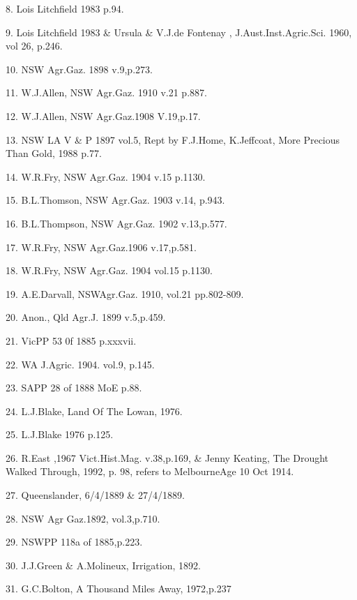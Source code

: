 8.  Lois Litchfield 1983 p.94.

9.  Lois Litchfield 1983 \& Ursula \& V.J.de Fontenay , J.Aust.Inst.Agric.Sci.
     1960, vol 26, p.246. 

10.  NSW Agr.Gaz. 1898 v.9,p.273. 

11. W.J.Allen, NSW Agr.Gaz. 1910 v.21 p.887.

12. W.J.Allen, NSW Agr.Gaz.1908 V.19,p.17.

13. NSW LA V \& P 1897 vol.5, Rept by F.J.Home,  K.Jeffcoat, More 
      Precious Than Gold, 1988 p.77.

14. W.R.Fry, NSW Agr.Gaz. 1904 v.15 p.1130.

15.  B.L.Thomson, NSW Agr.Gaz. 1903 v.14, p.943.

16.  B.L.Thompson, NSW Agr.Gaz. 1902 v.13,p.577.

17. W.R.Fry, NSW Agr.Gaz.1906 v.17,p.581.

18. W.R.Fry,  NSW Agr.Gaz. 1904 vol.15 p.1130.

19. A.E.Darvall, NSWAgr.Gaz. 1910, vol.21 pp.802-809.

20. Anon., Qld Agr.J. 1899 v.5,p.459.

21. VicPP 53 0f 1885 p.xxxvii.

22.  WA J.Agric. 1904. vol.9, p.145.

23.  SAPP 28 of 1888 MoE p.88.

24.  L.J.Blake, Land Of The Lowan, 1976.

25.  L.J.Blake 1976 p.125.

26.  R.East ,1967 Vict.Hist.Mag. v.38,p.169, \& Jenny Keating, The Drought
       Walked Through, 1992, p. 98, refers to MelbourneAge 10 Oct 1914.

27.  Queenslander, 6/4/1889 \& 27/4/1889.

28.  NSW Agr Gaz.1892, vol.3,p.710.

29.  NSWPP 118a of 1885,p.223.

30.  J.J.Green \& A.Molineux, Irrigation, 1892.

31.  G.C.Bolton, A Thousand Miles Away, 1972,p.237

